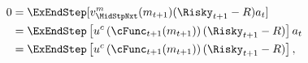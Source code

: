   \begin{equation}\begin{gathered}\begin{aligned}
        0  & = \ExEndStep[{\vFunc}_{\MidStpNxt}^{{m}}({m}_{t+1})(\Risky_{t+1}-\Rfree){a}_{t}] \notag
        \\         & = \ExEndStep\left[\uFunc^{{c}}\left(\cFunc_{t+1}({m}_{t+1})\right)(\Risky_{t+1}-\Rfree)\right]{a}_{t}
        \\         & = \ExEndStep\left[\uFunc^{{c}}\left(\cFunc_{t+1}({m}_{t+1})\right)(\Risky_{t+1}-\Rfree)\right], \label{eq:FOCw}
      \end{aligned}\end{gathered}\end{equation}
